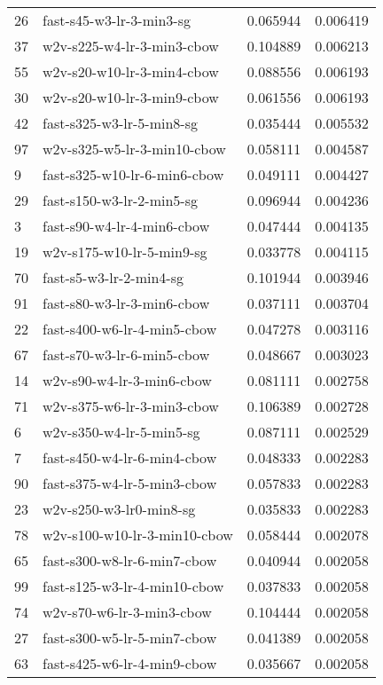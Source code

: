 {\begin{tabular}{llrr}
26 &      fast-s45-w3-lr-3-min3-sg &  0.065944 &  0.006419 \\
37 &    w2v-s225-w4-lr-3-min3-cbow &  0.104889 &  0.006213 \\
55 &    w2v-s20-w10-lr-3-min4-cbow &  0.088556 &  0.006193 \\
30 &    w2v-s20-w10-lr-3-min9-cbow &  0.061556 &  0.006193 \\
42 &     fast-s325-w3-lr-5-min8-sg &  0.035444 &  0.005532 \\
97 &   w2v-s325-w5-lr-3-min10-cbow &  0.058111 &  0.004587 \\
9  &  fast-s325-w10-lr-6-min6-cbow &  0.049111 &  0.004427 \\
29 &     fast-s150-w3-lr-2-min5-sg &  0.096944 &  0.004236 \\
3  &    fast-s90-w4-lr-4-min6-cbow &  0.047444 &  0.004135 \\
19 &     w2v-s175-w10-lr-5-min9-sg &  0.033778 &  0.004115 \\
70 &       fast-s5-w3-lr-2-min4-sg &  0.101944 &  0.003946 \\
91 &    fast-s80-w3-lr-3-min6-cbow &  0.037111 &  0.003704 \\
22 &   fast-s400-w6-lr-4-min5-cbow &  0.047278 &  0.003116 \\
67 &    fast-s70-w3-lr-6-min5-cbow &  0.048667 &  0.003023 \\
14 &     w2v-s90-w4-lr-3-min6-cbow &  0.081111 &  0.002758 \\
71 &    w2v-s375-w6-lr-3-min3-cbow &  0.106389 &  0.002728 \\
6  &      w2v-s350-w4-lr-5-min5-sg &  0.087111 &  0.002529 \\
7  &   fast-s450-w4-lr-6-min4-cbow &  0.048333 &  0.002283 \\
90 &   fast-s375-w4-lr-5-min3-cbow &  0.057833 &  0.002283 \\
23 &       w2v-s250-w3-lr0-min8-sg &  0.035833 &  0.002283 \\
78 &  w2v-s100-w10-lr-3-min10-cbow &  0.058444 &  0.002078 \\
65 &   fast-s300-w8-lr-6-min7-cbow &  0.040944 &  0.002058 \\
99 &  fast-s125-w3-lr-4-min10-cbow &  0.037833 &  0.002058 \\
74 &     w2v-s70-w6-lr-3-min3-cbow &  0.104444 &  0.002058 \\
27 &   fast-s300-w5-lr-5-min7-cbow &  0.041389 &  0.002058 \\
63 &   fast-s425-w6-lr-4-min9-cbow &  0.035667 &  0.002058 \\

\end{tabular}}
